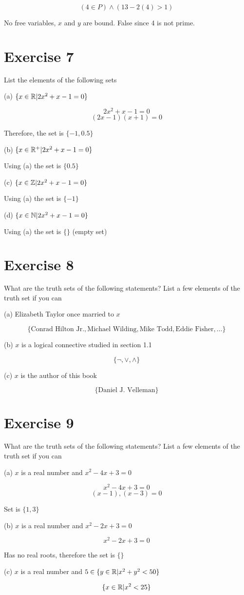 \documentclass[11pt]{article}
\begin{document}
$$(4 \in P) \wedge (13 - 2(4) > 1)$$

No free variables, $x$ and $y$ are bound. False since 4 is not prime.

\section*{Exercise 7}

List the elements of the following sets

\noindent (a) $\{x \in \mathbb{R} \text{\textbar} 2x^2 + x - 1 = 0 \}$

$$2x^2 + x - 1 = 0 $$
$$(2x -1)(x+1)=0$$

Therefore, the set is $\{-1, 0.5\}$

\noindent (b) $\{x \in \mathbb{R}^+ \text{\textbar} 2x^2 + x - 1 = 0 \}$

Using (a) the set is $\{0.5\}$

\noindent (c) $\{x \in \mathbb{Z} \text{\textbar} 2x^2 + x - 1 = 0 \}$

Using (a) the set is $\{-1\}$

\noindent (d) $\{x \in \mathbb{N} \text{\textbar} 2x^2 + x - 1 = 0 \}$

Using (a) the set is $\{\}$ (empty set)

\section*{Exercise 8}

What are the truth sets of the following statements? List a few elements of the truth set if you can

\noindent (a) Elizabeth Taylor once married to $x$

$$\{\text{Conrad Hilton Jr.}, \text{Michael Wilding}, \text{Mike Todd}, \text{Eddie Fisher}, \dots \}$$

\noindent (b) $x$ is a logical connective studied in section 1.1

$$\{\neg, \vee, \wedge \}$$

\noindent (c) $x$ is the author of this book

$$\{\text{Daniel J. Velleman}\}$$

\section*{Exercise 9}

What are the truth sets of the following statements? List a few elements of the truth set if you can

\noindent (a) $x$ is a real number and $x^2 -4x + 3 = 0$

$$x^2 -4x + 3 = 0$$
$$(x-1),(x-3) = 0$$

Set is $\{1,3\}$

\noindent (b) $x$ is a real number and $x^2 -2x + 3 = 0$

$$x^2 -2x + 3 = 0$$

Has no real roots, therefore the set is $\{\}$

\noindent (c) $x$ is a real number and $5 \in \{y \in \mathbb{R} \text{\textbar} x^2 + y^2 < 50 \}$

$$\{x \in \mathbb{R} \text{\textbar} x^2 < 25\}$$
\end{document}
